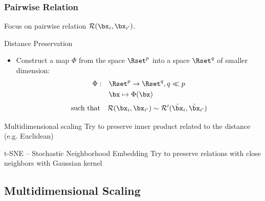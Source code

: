 \documentclass{beamer}\usepackage[]{graphicx}\usepackage[]{color}
\begin{document}
\begin{frame}
    \frametitle{Pairwise Relation}

    Focus on pairwise relation $\mathcal{R}(\bx_i, \bx_{i'})$.

    \begin{block}{Distance Preservation}
      \begin{itemize}
    \item  Construct a map $\Phi$ from the space $\Rset^{p}$ into a space $\Rset^{q}$ of \alert{smaller dimension}:
      \begin{align*}
      \Phi:\quad & \Rset^p \to \Rset^{q}, q \ll p\\
               & \bx \mapsto \Phi(\bx)
      \end{align*}
      \begin{equation*}
      \text{such that} \quad \mathcal{R}(\bx_i, \bx_{i'}) \sim\mathcal{R'}(\tilde\bx_i, \tilde\bx_{i'})
      \end{equation*}
    \end{itemize}
  \end{block}

  \begin{block}{Multidimensional scaling}
    Try to preserve inner product related to the distance (e.g. Euclidean)
  \end{block}

  \vfill

  \begin{block}{t-SNE -- Stochastic Neighborhood Embedding}
    Try to preserve relations with close neighbors with Gaussian kernel
  \end{block}

\end{frame}


\subsection{Multidimensional Scaling}
\end{document}
